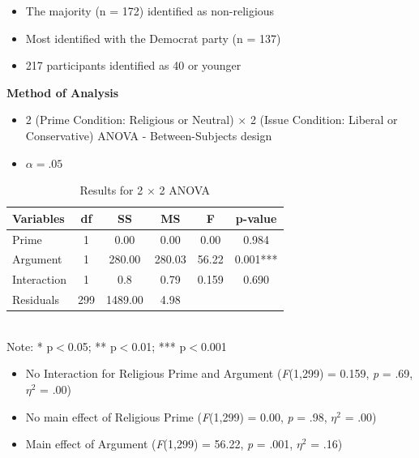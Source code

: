 \documentclass[landscape,a0paper,fontscale=0.285]{baposter} %
\newcommand{\compresslist}{ %
\setlength{\itemsep}{1pt}
\setlength{\parskip}{0pt}
\setlength{\parsep}{0pt}
}
\newcommand\e{\emph}
\newcommand\tb{\textbf}
\begin{document}
\begin{poster}
{\begin{multicols}{2}
\begin{itemize}\compresslist
	\item The majority (n = 172) identified as non-religious
	\item Most identified with the Democrat party (n = 137)
	\item 217 participants identified as 40 or younger
\end{itemize}

\tb{Method of Analysis}

\begin{itemize} \compresslist
	\item 2 (Prime Condition: Religious or Neutral) $\times$ 2 (Issue Condition: Liberal or Conservative) ANOVA - Between-Subjects design
	\item $\alpha = .05$
\end{itemize}
\end{multicols}


\begin{multicols}{2}
\vspace{1em}
\begin{table}[H]
	\centering
	\caption{Results for 2 $\times$ 2 ANOVA}
	\small
	\begin{tabular}{lccccc}
		\hline
		\tb{Variables}&\tb{df}&\tb{SS}&\tb{MS}&\tb{F}&\tb{p-value}\\
		\hline
		Prime&1&0.00&0.00&0.00&0.984\\
		Argument&1&280.00&280.03&56.22&0.001***\\
		Interaction&1&0.8&0.79&0.159&0.690\\
		Residuals&299&1489.00&4.98&&\\
		\hline
	\end{tabular}\\
	Note: * p$<$0.05; ** p$<$0.01; *** p$<$0.001
\end{table}


\begin{itemize} \compresslist
	\item No Interaction for Religious Prime and Argument (\e{F}(1,299) = 0.159, \e{p} = .69, $\eta^{2}$ = .00)
	\item No main effect of Religious Prime (\e{F}(1,299) = 0.00, \e{p} = .98, $\eta^{2}$ = .00)
	\item Main effect of Argument (\e{F}(1,299) = 56.22, \e{p} = .001, $\eta^{2}$ = .16)
\end{itemize}


\end{multicols}}
\end{poster}
\end{document}
